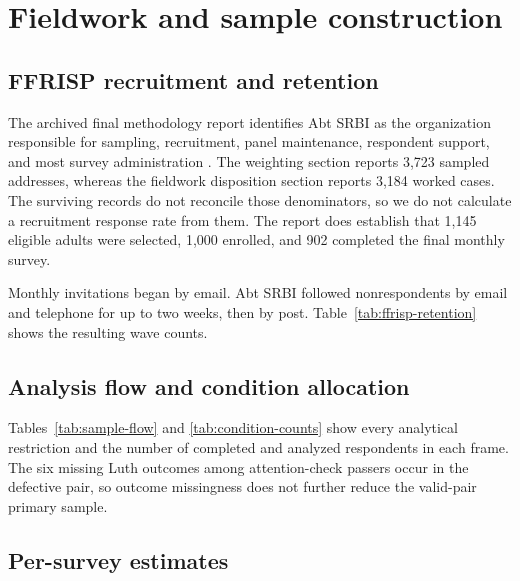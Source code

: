 \documentclass[11pt]{article}
\begin{document}
\printbibliography

\clearpage
\appendix
\setcounter{table}{0}
\renewcommand{\thetable}{SI\arabic{table}}
\renewcommand{\theHtable}{SI\arabic{table}}
\section{Fieldwork and sample construction}

\subsection{FFRISP recruitment and retention}

The archived final methodology report identifies Abt SRBI as the organization responsible for sampling, recruitment, panel maintenance, respondent support, and most survey administration \parencite{ackermann2009ffrisp}. The weighting section reports 3,723 sampled addresses, whereas the fieldwork disposition section reports 3,184 worked cases. The surviving records do not reconcile those denominators, so we do not calculate a recruitment response rate from them. The report does establish that 1,145 eligible adults were selected, 1,000 enrolled, and 902 completed the final monthly survey.

Monthly invitations began by email. Abt SRBI followed nonrespondents by email and telephone for up to two weeks, then by post. Table~\ref{tab:ffrisp-retention} shows the resulting wave counts.



\subsection{Analysis flow and condition allocation}

Tables~\ref{tab:sample-flow} and \ref{tab:condition-counts} show every analytical restriction and the number of completed and analyzed respondents in each frame. The six missing Luth outcomes among attention-check passers occur in the defective pair, so outcome missingness does not further reduce the valid-pair primary sample.





\subsection{Per-survey estimates}
\end{document}
